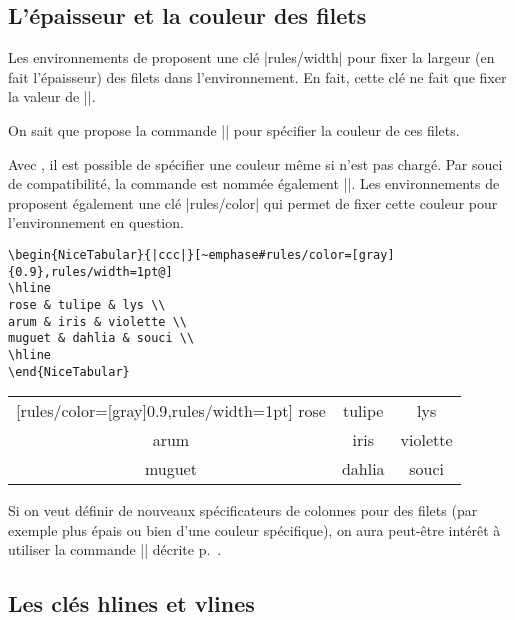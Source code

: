 \documentclass[dvipsnames]{article}%
\begin{document}
\subsection{L'épaisseur et la couleur des filets}

Les environnements de  proposent une clé |rules/width| pour
fixer la largeur (en fait l'épaisseur) des filets dans l'environnement. En fait,
cette clé ne fait que fixer la valeur de |\arrayrulewidth|.

\smallskip
On sait que  propose la commande |\arrayrulecolor| pour spécifier
la couleur de ces filets.

\smallskip
Avec , il est possible de spécifier une couleur même si
 n'est pas chargé. Par souci de compatibilité, la commande est
nommée également |\arrayrulecolor|. Les environnements de 
proposent également une clé |rules/color| qui permet de fixer cette couleur pour
l'environnement en question.

\medskip
\begin{scope}
\hfuzz=10cm
\begin{BVerbatim}[baseline=c,boxwidth=9.5cm]
\begin{NiceTabular}{|ccc|}[~emphase#rules/color=[gray]{0.9},rules/width=1pt@]
\hline
rose & tulipe & lys \\
arum & iris & violette \\
muguet & dahlia & souci \\
\hline
\end{NiceTabular}
\end{BVerbatim}
\begin{NiceTabular}{|ccc|}[rules/color=[gray]{0.9},rules/width=1pt]
\hline
rose & tulipe & lys \\
arum & iris & violette \\
muguet & dahlia & souci \\
\hline
\end{NiceTabular}
\end{scope}

\medskip
Si on veut définir de nouveaux spécificateurs de colonnes pour des filets (par
exemple plus épais ou bien d'une couleur spécifique), on aura peut-être intérêt
à utiliser la commande |\OnlyMainNiceMatrix| décrite
p.~\pageref{OnlyMainNiceMatrix}.





\bigskip
\subsection{Les clés hlines et vlines}
\end{document}
